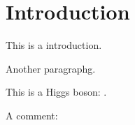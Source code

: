 \section{Introduction}

This is a  introduction.

Another paragraphg.


This is a Higgs boson: \hboson.


A comment: 

\hgg \hzz \hbb